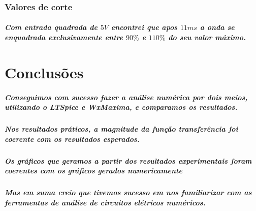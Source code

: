 \documentclass[12pt,twoside, a4paper, twocolumn]{article}
\begin{document}
\subsubsection{Valores de corte}


\subparagraph*{Com entrada quadrada de $5V$ encontrei que apos $11ms$ a onda se enquadrada exclusivamente entre $90\%$ e $110\%$ do seu valor máximo.}


\newpage


\section{Conclusões}




\subparagraph*{Conseguimos com sucesso fazer a análise numérica por dois meios, utilizando o LTSpice e WxMaxima, e comparamos os resultados.}


\subparagraph*{Nos resultados práticos, a magnitude da função transferência foi coerente com os resultados esperados.}




\subparagraph*{Os gráficos que geramos a partir dos resultados experimentais foram coerentes com os gráficos gerados numericamente}


\subparagraph*{Mas em suma creio que tivemos sucesso em nos familiarizar com as ferramentas de análise de circuitos elétricos numéricos.}
\end{document}
